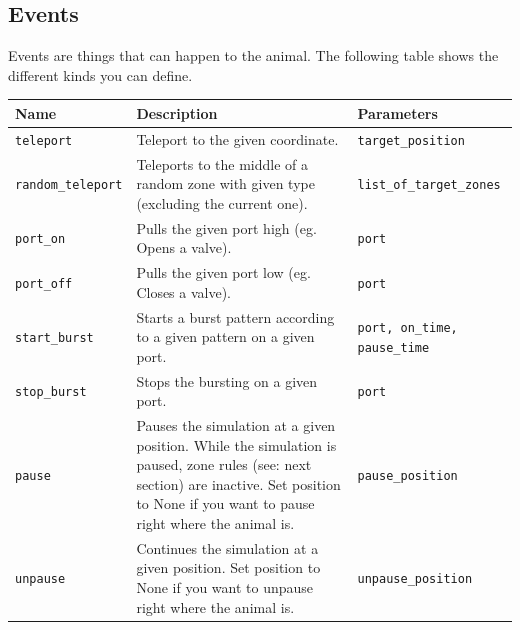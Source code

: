 \documentclass[11pt,a4paper]{article}
\begin{document}
\nocite{When specifying the parameters of a frame, always name the arguments (as seen above).}

\subsection{Events}
Events are things that can happen to the animal. The following table shows the different kinds you
can define.\\


\begin{tabularx}{\textwidth}{|p{3.1cm}|X|p{4cm}|}
\hline 
\rule[-1ex]{0pt}{2.5ex} 
\textbf{Name} & \textbf{Description} & \textbf{Parameters} \\ 

\hline 
\rule[-1ex]{0pt}{2.5ex} 
\texttt{teleport} & Teleport to the given coordinate. & \texttt{target\_position} \\ 

\hline 
\rule[-1ex]{0pt}{2.5ex} 
\texttt{random\_teleport} & Teleports to the middle of a random zone with given type (excluding the current one). & \texttt{list\_of\_target\_zones} \\ 

\hline 
\rule[-1ex]{0pt}{2.5ex} 
\texttt{port\_on} & Pulls the given port high
(eg. Opens a valve). & \texttt{port} \\ 

\hline 
\rule[-1ex]{0pt}{2.5ex} \texttt{port\_off} & Pulls the given port low (eg. Closes a valve). & \texttt{port} \\ 

\hline 
\rule[-1ex]{0pt}{2.5ex} 
\texttt{start\_burst} & Starts a burst pattern according to a given pattern on a given port. & \texttt{port, on\_time, pause\_time} \\ 

\hline 
\rule[-1ex]{0pt}{2.5ex} 
\texttt{stop\_burst} & Stops the bursting on a given port. & \texttt{port} \\ 

\hline 
\rule[-1ex]{0pt}{2.5ex} 
\texttt{pause} & Pauses the simulation at a given position. While the simulation is paused, zone rules (see: next section) are inactive. Set position to None if you want to pause right where the animal is. & \texttt{pause\_position} \\ 

\hline 
\rule[-1ex]{0pt}{2.5ex} 
\texttt{unpause} & Continues the simulation at a given position. Set position to None if you want to unpause right where the animal is. & \texttt{unpause\_position} \\ 

\hline 
\end{tabularx} 
\end{document}
